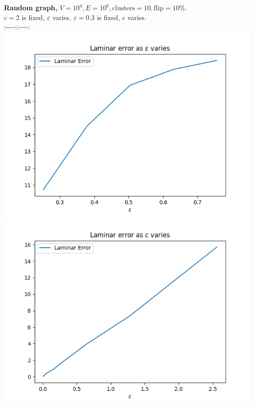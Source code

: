 \documentclass[
]{article}
\begin{document}
\textbf{Random graph,}
{\(V = 10^{4},E = 10^{6},\text{clusters} = 10,\text{flip} = 10\%\)}.\\
{\(c = 2\)} is fixed, {\(\varepsilon\)} varies. \textbar{}
{\(\varepsilon = 0.3\)} is fixed, {\(c\)} varies.\\
:-\/-\/-\/-:\textbar:-\/-\/-\/-:\\
\includegraphics{images/laminar_error_as_epsilon_varies.png}
\textbar{}
\includegraphics{images/laminar_error_as_c_varies.png}
\end{document}
